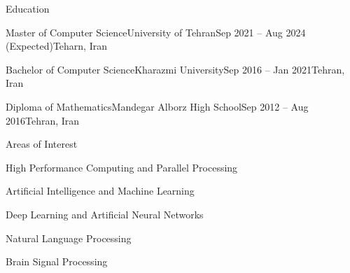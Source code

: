 \documentclass[]{main}
\begin{document}
\resumeheader
{}
{}
{}
{}
{}
{}

\begin{section}{Education}
 \begin{subsectionnobullet}{Master of Computer Science}{University of Tehran}{Sep 2021 -- Aug 2024 (Expected)}{Teharn, Iran}
 \end{subsectionnobullet}

 \begin{subsectionnobullet}{Bachelor of Computer Science}{Kharazmi University}{Sep 2016 -- Jan 2021}{Tehran, Iran}
 \end{subsectionnobullet}

 \begin{subsectionnobullet}{Diploma of Mathematics}{Mandegar Alborz High School}{Sep 2012 -- Aug 2016}{Tehran, Iran}
 \end{subsectionnobullet}
\end{section}

\begin{section}{Areas of Interest}
 \begin{subsectionbullet}
     \item High Performance Computing and Parallel Processing
     \item Artificial Intelligence and Machine Learning
     \item Deep Learning and Artificial Neural Networks
     \item Natural Language Processing
     \item Brain Signal Processing
 \end{subsectionbullet}
\end{section}
\end{document}
